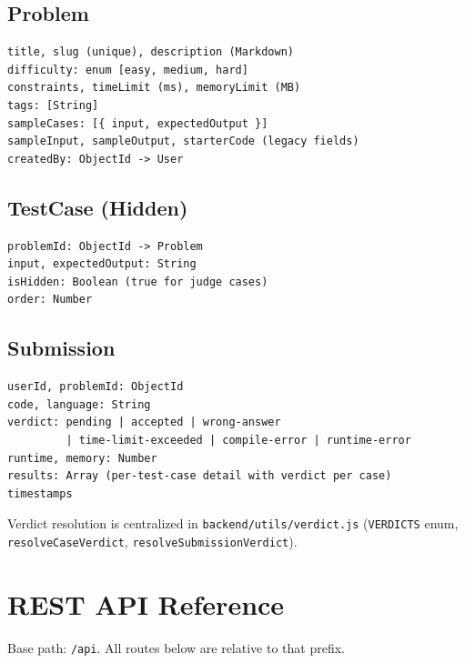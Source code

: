 \documentclass[11pt,a4paper]{article}
\begin{document}
\subsection{Problem}
\begin{lstlisting}[style=envfile]
title, slug (unique), description (Markdown)
difficulty: enum [easy, medium, hard]
constraints, timeLimit (ms), memoryLimit (MB)
tags: [String]
sampleCases: [{ input, expectedOutput }]
sampleInput, sampleOutput, starterCode (legacy fields)
createdBy: ObjectId -> User
\end{lstlisting}

\subsection{TestCase (Hidden)}
\begin{lstlisting}[style=envfile]
problemId: ObjectId -> Problem
input, expectedOutput: String
isHidden: Boolean (true for judge cases)
order: Number
\end{lstlisting}

\subsection{Submission}
\begin{lstlisting}[style=envfile]
userId, problemId: ObjectId
code, language: String
verdict: pending | accepted | wrong-answer
         | time-limit-exceeded | compile-error | runtime-error
runtime, memory: Number
results: Array (per-test-case detail with verdict per case)
timestamps
\end{lstlisting}

Verdict resolution is centralized in \texttt{backend/utils/verdict.js} (\texttt{VERDICTS} enum, \texttt{resolveCaseVerdict}, \texttt{resolveSubmissionVerdict}).

\section{REST API Reference}

Base path: \texttt{/api}. All routes below are relative to that prefix.
\end{document}
